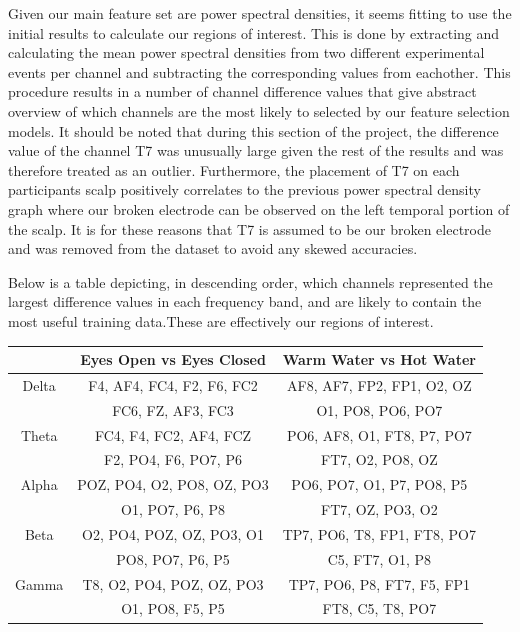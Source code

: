 \documentclass[11pt]{article}
\begin{document}
Given our main feature set are power spectral densities, it seems fitting to use the initial results to calculate our regions of interest. This is done by extracting and calculating the mean power spectral densities from two different experimental events per channel and subtracting the corresponding values from eachother. This procedure results in a number of channel difference values that give abstract overview of which channels are the most likely to selected by our feature selection models. It should be noted that during this section of the project, the difference value of the channel T7 was unusually large given the rest of the results and was therefore treated as an outlier. Furthermore, the placement of T7 on each participants scalp positively correlates to the previous power spectral density graph where our broken electrode can be observed on the left temporal portion of the scalp. It is for these reasons that T7 is assumed to be our broken electrode and was removed from the dataset to avoid any skewed accuracies.

Below is a table depicting, in descending order, which channels represented the largest difference values in each frequency band, and are likely to contain the most useful training data.These are effectively our regions of interest.

\begin{center}
\begin{tabular}{ ccc} 
\hline
 & Eyes Open vs Eyes Closed & Warm Water vs Hot Water\\
\hline
\multirow{1.2}{5em}{Delta}
& F4, AF4, FC4, F2, F6, FC2 & AF8, AF7, FP2, FP1, O2, OZ\\ 
& FC6, FZ, AF3, FC3  & O1, PO8, PO6, PO7 \\
\multirow{1.2}{5em}{Theta}
& FC4, F4, FC2, AF4, FCZ & PO6, AF8, O1, FT8, P7, PO7 \\ 
& F2, PO4, F6, PO7, P6 &  FT7, O2, PO8, OZ \\
\multirow{1.2}{5em}{Alpha}
& POZ, PO4, O2, PO8, OZ, PO3  & PO6, PO7, O1, P7, PO8, P5 \\ 
& O1, PO7, P6, P8 & FT7, OZ, PO3, O2 \\
\multirow{1.2}{5em}{Beta}
& O2, PO4, POZ, OZ, PO3, O1  & TP7, PO6, T8, FP1, FT8, PO7\\ 
& PO8, PO7, P6, P5 & C5, FT7, O1, P8 \\
\multirow{1.2}{5em}{Gamma}
& T8, O2, PO4, POZ, OZ, PO3  & TP7, PO6, P8, FT7, F5, FP1 \\ 
& O1, PO8, F5, P5 & FT8, C5, T8, PO7 \\
\hline
\end{tabular}
\end{center}
\end{document}

